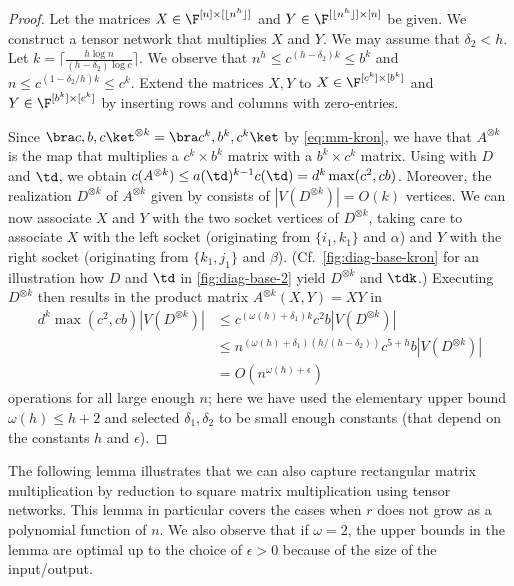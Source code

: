 \begin{proof}
Let the matrices $X\in\F^{[n]\times[\lfloor n^h\rfloor]}$
and $Y\in\F^{[\lfloor n^h\rfloor]\times[n]}$ be given. We construct
a tensor network that multiplies $X$ and $Y$.
We may assume that $\delta_2<h$.
Let $k=\lceil\frac{h\log n}{(h-\delta_2)\log c}\rceil$.
We observe that $n^h\leq c^{(h-\delta_2)k}\leq b^k$
and $n\leq c^{(1-\delta_2/h)k}\leq c^k$.
Extend the matrices $X,Y$ to $X\in\F^{[c^k]\times [b^k]}$ and
$Y\in\F^{[b^k]\times [c^k]}$ by inserting rows and columns with
zero-entries.

Since $\bra c,b,c\ket^{\otimes k}=\bra c^k,b^k,c^k\ket$ by
\eqref{eq:mm-kron}, we have that $A^{\otimes k}$ is the map that
multiplies a $c^k\times b^k$ matrix with a $b^k\times c^k$ matrix.
Using  with $D$ and $\td$, we obtain
$c(A^{\otimes k})\leq a(\td)^{k-1}c(\td)=d^{k}\max(c^2,cb)$.
Moreover, the realization $D^{\otimes k}$ of $A^{\otimes k}$
given by  consists of
$|V(D^{\otimes k})|=O(k)$ vertices.
We can now associate $X$ and $Y$ with the
two socket vertices of $D^{\otimes k}$, taking care to
associate $X$ with the left socket (originating from $\{i_1,k_1\}$ and $\alpha$)
and $Y$ with the right socket (originating from $\{k_1,j_1\}$ and $\beta$).
(Cf.~\eqref{fig:diag-base-kron} for an illustration how $D$ and $\td$
in \eqref{fig:diag-base-2} yield $D^{\otimes k}$ and $\tdk$.)
Executing $D^{\otimes k}$ then results in the product matrix
$A^{\otimes k}(X,Y)=XY$ in
\[
\begin{split}
d^{k}\max(c^2,cb)|V(D^{\otimes k})|
 &\leq c^{(\omega(h)+\delta_1)k}c^2b|V(D^{\otimes k})| \\
 &\leq n^{(\omega(h)+\delta_1)(h/(h-\delta_2))}c^{5+h}b|V(D^{\otimes k})| \\
 &=O(n^{\omega(h)+\epsilon})
\end{split}
\]
operations for all large enough $n$; here we have used the elementary
upper bound $\omega(h)\leq h+2$ and selected $\delta_1,\delta_2$ to be
small enough constants (that depend on the constants $h$ and $\epsilon$).
\end{proof}

The following lemma illustrates that we can also capture rectangular matrix
multiplication by reduction to square matrix multiplication using tensor
networks. This lemma in particular covers the cases when $r$ does not grow
as a polynomial function of $n$. We also observe that if $\omega=2$, the upper
bounds in the lemma are optimal up to the choice of $\epsilon>0$ because of
the size of the input/output.

